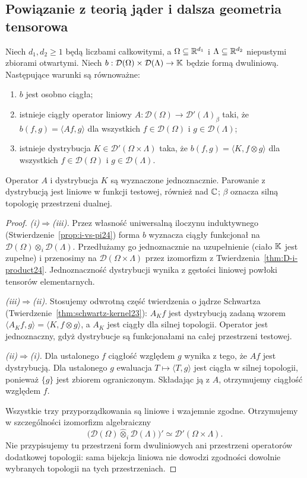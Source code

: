 \subsection{Powiązanie z teorią jąder i dalsza geometria tensorowa}

\begin{wniosek}
\label{cor:kernel-i24}
Niech $d_1,d_2\ge1$ będą liczbami całkowitymi,
a $\Omega\subseteq\mathbb R^{d_1}$ i $\Lambda\subseteq\mathbb R^{d_2}$
niepustymi zbiorami otwartymi. Niech
$b:\mathcal D(\Omega)\times\mathcal D(\Lambda)\to\mathbb K$
będzie formą dwuliniową. Następujące warunki są równoważne:
\begin{enumerate}[label=\textup{(\roman*)},leftmargin=*]
\item $b$ jest osobno ciągła;
\item istnieje ciągły operator liniowy
$A:\mathcal D(\Omega)\to\mathcal D'(\Lambda)_\beta$
taki, że $b(f,g)=\langle Af,g\rangle$ dla wszystkich
$f\in\mathcal D(\Omega)$ i $g\in\mathcal D(\Lambda)$;
\item istnieje dystrybucja
$K\in\mathcal D'(\Omega\times\Lambda)$ taka, że
$b(f,g)=\langle K,f\otimes g\rangle$ dla wszystkich
$f\in\mathcal D(\Omega)$ i $g\in\mathcal D(\Lambda)$.
\end{enumerate}
Operator $A$ i dystrybucja $K$ są wyznaczone jednoznacznie.
Parowanie z dystrybucją jest liniowe w funkcji testowej,
również nad $\mathbb C$; $\beta$ oznacza silną topologię
przestrzeni dualnej.
\end{wniosek}
\begin{proof}
\emph{(i)$\Rightarrow$(iii).}
Przez własność uniwersalną iloczynu induktywnego
(Stwierdzenie~\ref{prop:i-vs-pi24}) forma $b$
wyznacza ciągły funkcjonał na
$\mathcal D(\Omega)\otimes_i\mathcal D(\Lambda)$.
Przedłużamy go jednoznacznie na uzupełnienie (ciało
$\mathbb K$ jest zupełne) i przenosimy na
$\mathcal D(\Omega\times\Lambda)$ przez izomorfizm
z Twierdzenia~\ref{thm:D-i-product24}.
Jednoznaczność dystrybucji wynika z gęstości
liniowej powłoki tensorów elementarnych.

\emph{(iii)$\Rightarrow$(ii).}
Stosujemy odwrotną część twierdzenia o jądrze
Schwartza (Twierdzenie~\ref{thm:schwartz-kernel23}):
$A_Kf$ jest dystrybucją zadaną wzorem
$\langle A_Kf,g\rangle=\langle K,f\otimes g\rangle$,
a $A_K$ jest ciągły dla silnej topologii.
Operator jest jednoznaczny, gdyż dystrybucje
są funkcjonałami na całej przestrzeni testowej.

\emph{(ii)$\Rightarrow$(i).}
Dla ustalonego $f$ ciągłość względem $g$ wynika
z tego, że $Af$ jest dystrybucją. Dla ustalonego
$g$ ewaluacja $T\mapsto\langle T,g\rangle$ jest
ciągła w silnej topologii, ponieważ $\{g\}$
jest zbiorem ograniczonym. Składając ją z $A$,
otrzymujemy ciągłość względem $f$.

Wszystkie trzy przyporządkowania są liniowe
i wzajemnie zgodne. Otrzymujemy w szczególności
izomorfizm algebraiczny
\[
 \bigl(\mathcal D(\Omega)\widehat\otimes_i
 \mathcal D(\Lambda)\bigr)'
 \simeq\mathcal D'(\Omega\times\Lambda).
\]
Nie przypisujemy tu przestrzeni form dwuliniowych
ani przestrzeni operatorów dodatkowej topologii:
sama bijekcja liniowa nie dowodzi zgodności
dowolnie wybranych topologii na tych przestrzeniach.
\end{proof}

